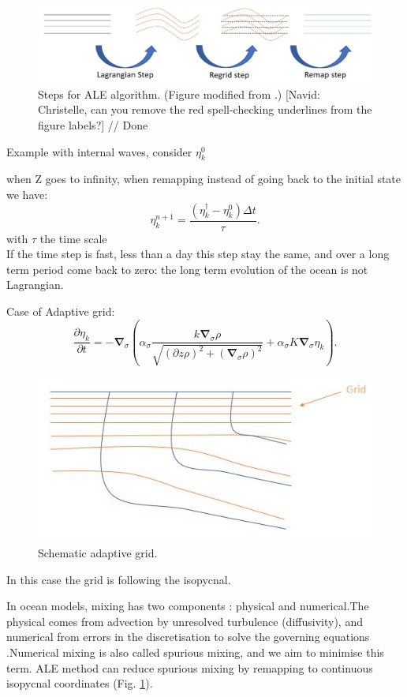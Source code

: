   \begin{figure}[h!]
  \centering
  \includegraphics[width=5in]{figures/lecture15_stepsale.JPG}
  \caption{Steps for ALE algorithm. (Figure modified from \citet{Griffies2019}.) {\color{red}[Navid: Christelle, can you remove the red spell-checking underlines from the figure labels?] // Done}}
  \end{figure}

Example with internal waves, consider $\eta_k ^0$ 

when Z goes to infinity, when remapping instead of going back to the initial state we have:
 \begin{equation}
  \eta_{k}^{n+1} = \frac{(\eta_{k}^\dagger - \eta_{k}^0)\Delta t}{\tau}.
 \end{equation}
 with $\tau$ the time scale
 \\If the time step is fast, less than a day this step stay the same, and over a long term period come back to zero: the long term evolution of the ocean is not Lagrangian.
 
 
  Case of Adaptive grid:
  \begin{equation}
     \frac{\partial \eta_k}{\partial t} =- \boldsymbol{\nabla}_\sigma(\alpha_\sigma\frac{k\boldsymbol{\nabla}_\sigma \rho}{\sqrt{(\partial{z} \rho)^2+(\boldsymbol{\nabla}_\sigma \rho)^2}}+\alpha_\sigma K\boldsymbol{\nabla}_\sigma \eta_k) .
 \end{equation}
  \begin{figure}[h!]
  \centering
  \includegraphics[width=5in]{figures/lecture15_adaptivegrid.JPG}
    \caption{Schematic adaptive grid.}
    \label{fig:lecture15_adaptivegrid}
    \end{figure}
  In this case the grid is following the isopycnal.
  
 In ocean models, mixing has two components : physical and numerical.The physical comes from advection by unresolved turbulence (diffusivity), and numerical from errors in the discretisation to solve the governing equations \citep{GIBSON201745}.Numerical mixing is also called spurious mixing, and we aim to minimise this term. ALE method can reduce spurious mixing by remapping to continuous isopycnal coordinates (Fig. \ref{fig:lecture15_adaptivegrid}).
 
